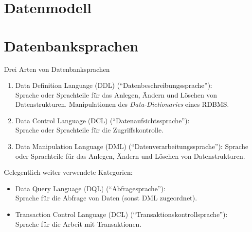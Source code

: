 \documentclass{scrbook}
\begin{document}
\section{Datenmodell}





\section{Datenbanksprachen} %

Drei Arten von Datenbanksprachen
\begin{enumerate}
\item Data Definition Language (DDL) (\enquote{Datenbeschreibungssprache}):\\
	Sprache oder Sprachteile für das Anlegen, Ändern und Löschen von Datenstrukturen.
	Manipulationen des \emph{Data-Dictionaries} eines RDBMS.
\item Data Control Language (DCL) (\enquote{Datenaufsichtssprache}):\\
	Sprache oder Sprachteile für die Zugriffskontrolle.
\item Data Manipulation Language (DML) (\enquote{Datenverarbeitungssprache}):
	Sprache oder Sprachteile für das Anlegen, Ändern und Löschen von Datenstrukturen.
\end{enumerate}

Gelegentlich weiter verwendete Kategorien:
\begin{itemize}
\item Data Query Language (DQL) (\enquote{Abfragesprache}):\\
	Sprache für die Abfrage von Daten (sonst DML zugeordnet).
\item Transaction Control Language (DCL) (\enquote{Transaktionskontrollsprache}):\\
	Sprache für die Arbeit mit Transaktionen.
\end{itemize}

\end{document}
